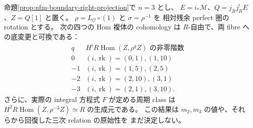 \begin{proposition}
\label{prop:nfm-boundary-threefold-low-hom}
命題\ref{prop:nfm-boundary-right-projection}で $n=3$ とし、
$E=i_*\mathcal M$、$Q=j_Rj_R^!E$、$Z=Q[1]$ と置く。
$\rho=L_{\mathcal O}\circ(1)$ と $\sigma=\rho^{-1}$ を
相対残余 perfect 圏の rotation とする。
次の四つの Hom 複体の cohomology は $R$-自由で、両 fibre への底変更と可換である：
\[
\begin{array}{c|c}
 q& H^iR\operatorname{Hom}(Z,\rho^qZ)\text{ の非零階数}\\\hline
 0&(i,\operatorname{rk})=(0,1),(1,10)\\
 -1&(i,\operatorname{rk})=(1,5),(2,5)\\
 -2&(i,\operatorname{rk})=(2,10),(3,1)\\
 -3&(i,\operatorname{rk})=(2,1),(3,10).
\end{array}
\]
さらに、実際の integral 方程式 $F$ が定める周期 class は
$H^2R\operatorname{Hom}(Z,\rho^{-3}Z)\simeq R$ の生成元である。
この結果は $m_2,m_3$ の値や、それらから回復した三次 relation の原始性を
まだ決定しない。
\end{proposition}

